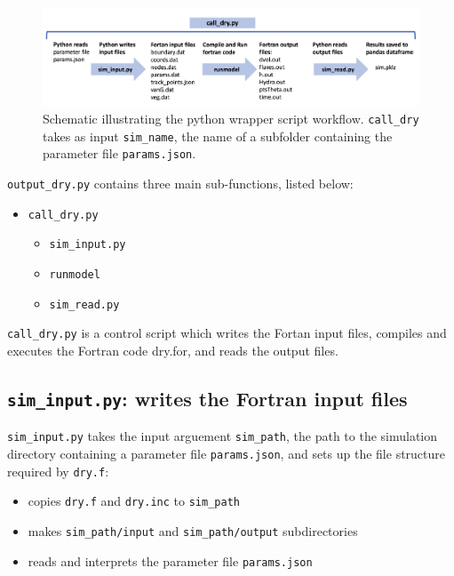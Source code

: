 \documentclass{article}
\newcommand{\code}[1]{\texttt{#1}}
\begin{document}
 \begin{figure}[h]
 \centering
\includegraphics[width=38pc]{grid/schematic.png}
 \caption{Schematic illustrating the python wrapper script workflow. \code{call\_dry} takes as input \code{sim\_name}, the name of a subfolder containing the parameter file \code{params.json}.}
 \label{schematic}
 \end{figure}
 
 
\code{output\_dry.py} contains three main sub-functions, listed below:
 \begin{itemize}
 	\item  \code{call\_dry.py} 
	\begin{itemize}
		\item \code{sim\_input.py} 
		\item \code{runmodel}
		\item \code{sim\_read.py}
	\end{itemize}
 \end{itemize}
 
 \code{call\_dry.py}  is a control script which writes the Fortan input files, compiles and executes the Fortran code dry.for, and reads the output files.

 
\subsection{\code{sim\_input.py}: writes the Fortran input files}


\code{sim\_input.py} takes the input arguement \code{sim\_path}, the path to the simulation directory containing a parameter file \code{params.json}, and sets up the file structure required by \code{dry.f}:
\begin{itemize}
	\item copies \code{dry.f} and \code{dry.inc} to \code{sim\_path}
	\item makes \code{sim\_path/input} and \code{sim\_path/output} subdirectories
	\item  reads and interprets the parameter file \code{params.json}    
\end{itemize}   
\end{document}
